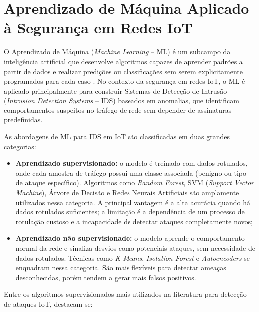\section{Aprendizado de Máquina Aplicado à Segurança em Redes IoT}\label{sec:ml_iot}

O Aprendizado de Máquina (\textit{Machine Learning} -- ML) é um subcampo da inteligência artificial que desenvolve algoritmos capazes de aprender padrões a partir de dados e realizar predições ou classificações sem serem explicitamente programados para cada caso \citep{Alfahaid2025}. No contexto da segurança em redes IoT, o ML é aplicado principalmente para construir Sistemas de Detecção de Intrusão (\textit{Intrusion Detection Systems} -- IDS) baseados em anomalias, que identificam comportamentos suspeitos no tráfego de rede sem depender de assinaturas predefinidas.

As abordagens de ML para IDS em IoT são classificadas em duas grandes categorias:

\begin{itemize}[leftmargin=5em]
    \item \textbf{Aprendizado supervisionado:} o modelo é treinado com dados rotulados, onde cada amostra de tráfego possui uma classe associada (benigno ou tipo de ataque específico). Algoritmos como \textit{Random Forest}, SVM (\textit{Support Vector Machine}), Árvore de Decisão e Redes Neurais Artificiais são amplamente utilizados nessa categoria. A principal vantagem é a alta acurácia quando há dados rotulados suficientes; a limitação é a dependência de um processo de rotulação custoso e a incapacidade de detectar ataques completamente novos;
    \item \textbf{Aprendizado não supervisionado:} o modelo aprende o comportamento normal da rede e sinaliza desvios como potenciais ataques, sem necessidade de dados rotulados. Técnicas como \textit{K-Means}, \textit{Isolation Forest} e \textit{Autoencoders} se enquadram nessa categoria. São mais flexíveis para detectar ameaças desconhecidas, porém tendem a gerar mais falsos positivos.
\end{itemize}

Entre os algoritmos supervisionados mais utilizados na literatura para detecção de ataques IoT, destacam-se:

